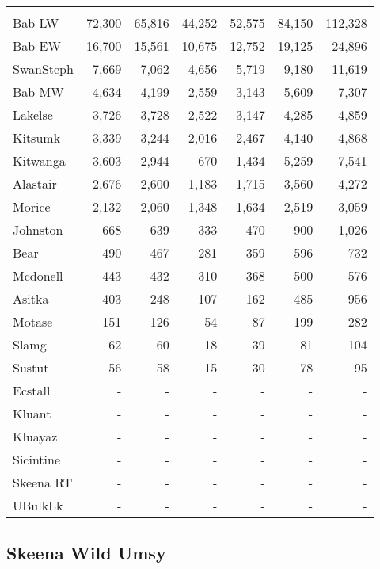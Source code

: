\documentclass[french,11pt]{book}
\begin{document}
\begin{longtable}[t]{lrrrrrr}
\midrule\\ Bab-LW & 72,300 & 65,816 & 44,252 & 52,575 & 84,150 & 112,328\\ Bab-EW & 16,700 & 15,561 & 10,675 & 12,752 & 19,125 & 24,896\\ SwanSteph & 7,669 & 7,062 & 4,656 & 5,719 & 9,180 & 11,619\\ Bab-MW & 4,634 & 4,199 & 2,559 & 3,143 & 5,609 & 7,307\\ Lakelse & 3,726 & 3,728 & 2,522 & 3,147 & 4,285 & 4,859\\ Kitsumk & 3,339 & 3,244 & 2,016 & 2,467 & 4,140 & 4,868\\ Kitwanga & 3,603 & 2,944 & 670 & 1,434 & 5,259 & 7,541\\ Alastair & 2,676 & 2,600 & 1,183 & 1,715 & 3,560 & 4,272\\ Morice & 2,132 & 2,060 & 1,348 & 1,634 & 2,519 & 3,059\\ Johnston & 668 & 639 & 333 & 470 & 900 & 1,026\\ Bear & 490 & 467 & 281 & 359 & 596 & 732\\ Mcdonell & 443 & 432 & 310 & 368 & 500 & 576\\ Asitka & 403 & 248 & 107 & 162 & 485 & 956\\ Motase & 151 & 126 & 54 & 87 & 199 & 282\\ Slamg & 62 & 60 & 18 & 39 & 81 & 104\\ Sustut & 56 & 58 & 15 & 30 & 78 & 95\\ Ecstall & - & - & - & - & - & -\\ Kluant & - & - & - & - & - & -\\ Kluayaz & - & - & - & - & - & -\\ Sicintine & - & - & - & - & - & -\\ Skeena RT & - & - & - & - & - & -\\ UBulkLk & - & - & - & - & - & -\\* \end{longtable}

\endgroup{} \endgroup{}

\clearpage

\subsection{Skeena Wild Umsy}\label{skeena-wild-umsy}
\end{document}

